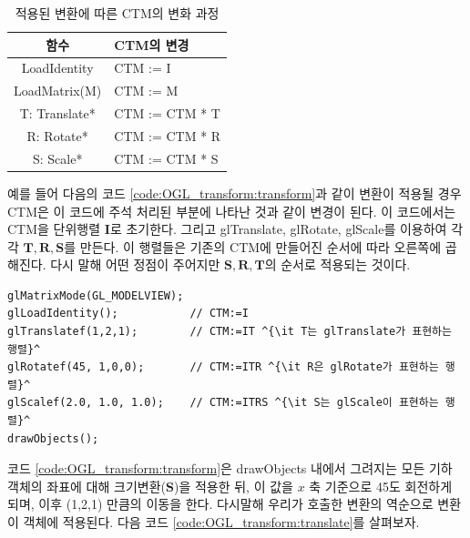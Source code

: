 \begin{table}
\caption{적용된 변환에 따른 CTM의 변화 과정}
\label{tab:transform:CTM}
\begin{tabular}{|c|p{10cm}|}\hline
{\small \sf 함수 } & {\small \sf CTM의 변경}\\ \hline
{\small \sf LoadIdentity} & {\small \sf CTM := I}\\ \hline
{\small \sf LoadMatrix(M)} & {\small \sf CTM := M}\\ \hline
{\small \sf T: Translate*} & {\small \sf CTM := CTM * T}\\ \hline
{\small \sf R: Rotate*} & {\small \sf CTM := CTM * R}\\ \hline
{\small \sf S: Scale*}	& {\small \sf CTM := CTM * S}\\ \hline
\end{tabular}
\end{table}

예를 들어 다음의 코드 \ref{code:OGL_transform:transform}과 같이 변환이 적용될 경우 
CTM은 이 코드에 주석 처리된 부분에 나타난 것과 같이 변경이 된다.
이 코드에서는 CTM을 단위행렬 $\mathbf I$로 초기한다.
그리고 {\sf glTranslate, glRotate, glScale}를 이용하여
각각 ${\mathbf T, \mathbf R, \mathbf S}$를 만든다. 이 행렬들은 기존의 CTM에 만들어진 순서에 따라
오른쪽에 곱해진다. 다시 말해 어떤 정점이 주어지만
${\mathbf S, \mathbf R, \mathbf T}$의 순서로 적용되는 것이다.



\begin{algorithmbis}\label{code:OGL_transform:transform}
\lstset{language=C++, escapechar=^} 
\begin{lstlisting}
glMatrixMode(GL_MODELVIEW);
glLoadIdentity();			// CTM:=I
glTranslatef(1,2,1);		// CTM:=IT ^{\it T는 glTranslate가 표현하는 행렬}^
glRotatef(45, 1,0,0);		// CTM:=ITR ^{\it R은 glRotate가 표현하는 행렬}^
glScalef(2.0, 1.0, 1.0);	// CTM:=ITRS ^{\it S는 glScale이 표현하는 행렬}^
drawObjects();
\end{lstlisting}
\end{algorithmbis}

코드 \ref{code:OGL_transform:transform}은 drawObjects 내에서 그려지는 모든 기하 객체의 좌표에 대해 크기변환($\mathbf S$)을 적용한 뒤, 이 값을 $x$ 축 기준으로 45도 회전하게 되며, 이후 (1,2,1) 만큼의 이동을 한다. 다시말해 우리가 호출한 변환의 역순으로 변환이 객체에 적용된다. 
다음 코드 \ref{code:OGL_transform:translate}를 살펴보자.

